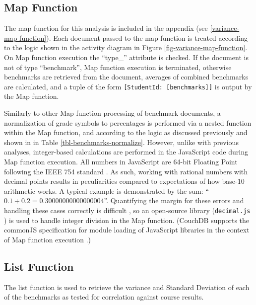 \subsection{Map Function}
The map function for this analysis is included in the appendix (see \ref{variance-map-function}). Each document passed to the map function is treated according to the logic shown in the activity diagram in Figure \ref{fig-variance-map-function}. On Map function execution the ``type\_'' attribute is checked. If the document is not of type ``benchmark'', Map function execution is terminated, otherwise benchmarks are retrieved from the document, averages of combined benchmarks are calculated, and a tuple of the form \texttt{[StudentId: [benchmarks]]} is output by the Map function.

Similarly to other Map function processing of benchmark documents, a normalization of grade symbols to percentages is performed via a nested function within the Map function, and according to the logic as discussed previously and shown in in Table \ref{tbl-benchmarks-normalize}. However, unlike with previous analyses, integer-based calculations are performed in the JavaScript code during Map function execution. All numbers in JavaScript are 64-bit Floating Point following the IEEE 754 standard \cite{floatingPoint}. As such, working with rational numbers with decimal points results in peculiarities compared to expectations of how base-10 arithmetic works. A typical example is demonstrated by the sum: ``$0.1 + 0.2 = 0.30000000000000004$''. Quantifying the margin for these errors and handling these cases correctly is difficult \cite{Goldberg1991}, so an open-source library (\texttt{decimal.js} \cite{decimaljs}) is used to handle integer division in the Map function. (CouchDB supports the commonJS specification for module loading of JavaScript libraries in the context of Map function execution \cite{commonJsMapFn}.)



\subsection{List Function}
The list function is used to retrieve the variance and Standard Deviation of each of the benchmarks as tested for correlation against course results.
